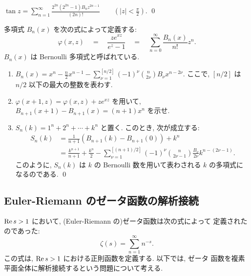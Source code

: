 \documentclass[12pt,twoside]{jarticle}
\begin{document}
\begin{question}
  \(
    \displaystyle
    \tan z
    = \sum_{n=1}^\infty \frac{2^{2n}(2^{2n}-1)B_nz^{2n-1}}{(2n)!}
    \qquad \left( |z| < \frac{\pi}{2} \right).
  \)
  \qed
\end{question}

\begin{question}
  多項式 $B_n(x)$ を次の式によって定義する:
  \[
    \varphi(x,z)
    \quad = \quad
    \frac{z e^{xz}}{e^z - 1}
    \quad = \quad 
    \sum_{n=0}^{\infty}\frac{B_n(x)}{n!}z^n.
  \]
  $B_n(x)$ は Bernoulli 多項式と呼ばれている. 
  \begin{enumerate}
  \item
    \(
    \displaystyle
      B_n(x)
      = 
      x^n - \frac{n}{2}x^{n-1}
      - \sum_{\nu=1}^{[n/2]} (-1)^\nu {n \choose 2\nu} B_\nu x^{n-2\nu}
    \).
    ここで, $[n/2]$ は $n/2$ 以下の最大の整数を表わす.
  \item
    \(
      \varphi(x+1,z) = \varphi(x,z) + z e^{xz}
    \)
    を用いて, 
    \(
      B_{n+1}(x+1) - B_{n+1}(x) = (n + 1) x^n
    \)
    を示せ.
  \item 
    \(
      S_n(k) = 1^n + 2^n + \cdots + k^n
    \)
    と置く. このとき, 次が成立する:
    \begin{align*}
      S_n(k) 
      & =
      \frac{1}{n+1}\left( B_{n+1}(k) - B_{n+1}(0) \right) + k^n
      \\
      & =
      \frac{k^{n+1}}{n+1} + \frac{k^n}{2}
      - \sum_{\nu=1}^{[(n+1)/2]}
        (-1)^\nu {n \choose 2\nu-1} \frac{B_\nu}{2\nu} k^{n-(2\nu-1)}.
    \end{align*}
    このように, $S_n(k)$ は $k$ の Bernoulli 数を用いて表わされる $k$ 
    の多項式になるのである. \qed
  \end{enumerate}
\end{question}



\subsection{Euler-Riemann のゼータ函数の解析接続}

$\mathop{\mathrm{Re}}\nolimits s > 1$ において, (Euler-Riemann の)ゼータ函数は次の式によって
定義されたのであった:
\[
  \zeta(s)
  = \sum_{n=1}^\infty n^{-s}. 
\]%
この式は, $\mathop{\mathrm{Re}}\nolimits s > 1$ における正則函数を定義する. 以下では, ゼータ
函数を複素平面全体に解析接続するという問題について考える.
\end{document}
